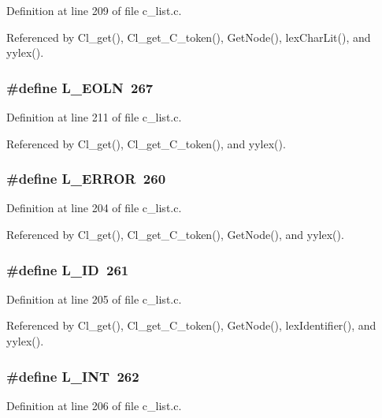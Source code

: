 Definition at line 209 of file c\_\-list.c.

Referenced by Cl\_\-get(), Cl\_\-get\_\-C\_\-token(), Get\-Node(), lex\-Char\-Lit(), and yylex().
\subsubsection{\setlength{\rightskip}{0pt plus 5cm}\#define L\_\-EOLN~267}\label{c__list_8c_2356f2d0198d898235ae134c80a28b7b}




Definition at line 211 of file c\_\-list.c.

Referenced by Cl\_\-get(), Cl\_\-get\_\-C\_\-token(), and yylex().
\subsubsection{\setlength{\rightskip}{0pt plus 5cm}\#define L\_\-ERROR~260}\label{c__list_8c_48538932682d4fe3cdf01547db361240}




Definition at line 204 of file c\_\-list.c.

Referenced by Cl\_\-get(), Cl\_\-get\_\-C\_\-token(), Get\-Node(), and yylex().
\subsubsection{\setlength{\rightskip}{0pt plus 5cm}\#define L\_\-ID~261}\label{c__list_8c_18c71d842c217aa8a076bad758992164}




Definition at line 205 of file c\_\-list.c.

Referenced by Cl\_\-get(), Cl\_\-get\_\-C\_\-token(), Get\-Node(), lex\-Identifier(), and yylex().
\subsubsection{\setlength{\rightskip}{0pt plus 5cm}\#define L\_\-INT~262}\label{c__list_8c_65e9e9ff7b6f371dabc4ce35a201c976}




Definition at line 206 of file c\_\-list.c.

